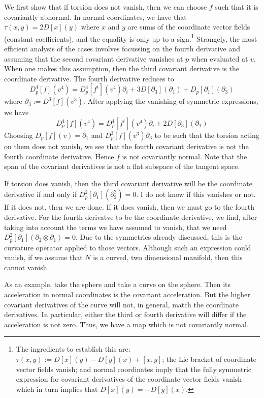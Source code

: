 \documentclass[11pt]{article}
\theoremstyle{remark}
\begin{document}
We first show that if torsion does not vanish, then we can choose $f$
such that it is covariantly abnormal. In normal coordinates, we have
that $\tau(x, y) = 2D[x] (y)$ where $x$ and $y$ are sums of the
coordinate vector fields (constant coefficients), 
and the equality is only up to a
sign.\footnote{The ingredients to establish this are:
 $\tau(x,y) \ensuremath{:=} D[x](y) - D[y](x) + [x,y]$; 
  the Lie bracket of coordinate vector fields vanish; and
   normal coordinates imply that the fully symmetric expression for
   covariant derivatives of the coordinate vector fields vanish which
   in turn implies that $D[x] (y) = -D[y](x)$. }
Strangely, the most efficient analysis of the cases involves focussing
on the fourth derivative and assuming that the second covariant derivative
vanishes at $p$ when evaluated at $v$. 
When one makes this assumption, then the third
covariant derivative is the coordinate derivative. The fourth
derivative reduces to 
\[
D^4_p[f] (v^4) = 
D^4_p[f^i](v^4) \partial_i 
+3 D[\partial_3](\partial_1) 
+ D_p[\partial_1](\partial_3) 
\]
where $\partial_3 \ensuremath{:=} D^3[f](v^3)$. 
After applying the vanishing of symmetric expressions, we have 
\[
D^4_p[f] (v^4) = 
D^4_p[f^i](v^4) \partial_i 
+2 D[\partial_3](\partial_1)
\]
Choosing $D_p[f](v) = \partial_1$
and $D^3_p[f](v^3) 
\partial_3$ to be such that the torsion acting on them does not
vanish, we see that the fourth covariant derivative is  not the fourth
coordinate derivative. Hence $f$ is not covariantly normal. Note that
the span of the covariant derivatives is not a flat subspace of the
tangent space. 

If torsion does vanish, then the third covariant derivative will be
the coordinate derivative if and only if 
$D^2_p[\partial_1](\partial_2^2) =0$. I do not know if this vanishes
or not. If it does not, then we are done. If it does vanish, then we must go
to the fourth derivative. For the fourth derivatve to be the
coordinate derivative, we find, after taking into account the
terms we have assumed to vanish,  that we need 
$ D^2_p[\partial_1] (\partial_2 \otimes \partial_1) =0$. Due to the
symmetries already discussed, this is the curvature operator applied
to those vectors. Although such an expression could vanish,
if we assume that $N$ is a curved, two dimensional manifold, then this
cannot vanish. 

As an example, take the sphere and take a curve on the sphere. Then
its acceleration in normal coordinates is the covariant
acceleration. But the higher covariant derivatives of the curve will
not, in general, match  the coordinate derivatives. In particular,
either the third or 
fourth derivative will differ if the acceleration is not zero. Thus,
we have a map which is not covariantly normal. 
\end{document}
